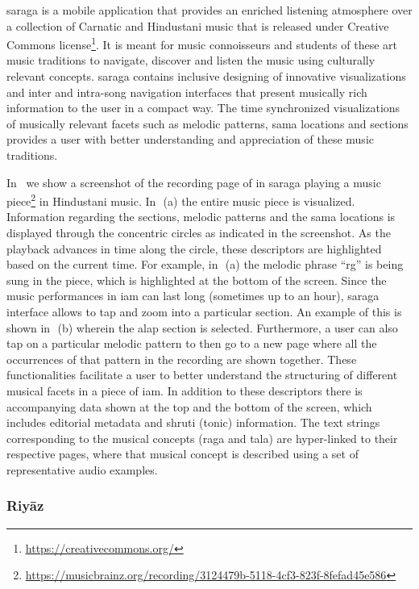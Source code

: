 \Gls{saraga} is a mobile application that provides an enriched listening atmosphere over a collection of Carnatic and Hindustani music that is released under Creative Commons license\footnote{\url{https://creativecommons.org/}}. It is meant for music connoisseurs and students of these art music traditions to navigate, discover and listen the music using culturally relevant concepts. \gls{saraga} contains inclusive designing of innovative visualizations and inter and intra-song navigation interfaces that present musically rich information to the user in a compact way. The time synchronized visualizations of musically relevant facets such as melodic patterns, \gls{sama} locations and sections provides a user with better understanding and appreciation of these music traditions.

In~ we show a screenshot of the recording page of in \gls{saraga} playing a music piece\footnote{\url{https://musicbrainz.org/recording/3124479b-5118-4cf3-823f-8fefad45e586}} in Hindustani music. In~\,(a) the entire music piece is visualized. Information regarding the sections, melodic patterns and the \gls{sama} locations is displayed through the concentric circles as indicated in the screenshot. As the playback advances in time along the circle, these descriptors are highlighted based on the current time. For example, in~\,(a) the melodic phrase ``rg'' is being sung in the piece, which is highlighted at the bottom of the screen. Since the music performances in \gls{iam} can last long (sometimes up to an hour), \gls{saraga} interface allows to tap and zoom into a particular section. An example of this is shown in~\,(b) wherein the \gls{alap} section is selected. Furthermore, a user can also tap on a particular melodic pattern to then go to a new page where all the occurrences of that pattern in the recording are shown together. These functionalities facilitate a user to better understand the structuring of different musical facets in a piece of \gls{iam}. In addition to these descriptors there is accompanying data shown at the top and the bottom of the screen, which includes editorial metadata and \gls{shruti} (tonic) information. The text strings corresponding to the musical concepts (\gls{raga} and \gls{tala}) are hyper-linked to their respective pages, where that musical concept is described using a set of representative audio examples. 


\subsubsection{Riy\={a}z}
\label{sec:riyaz}

